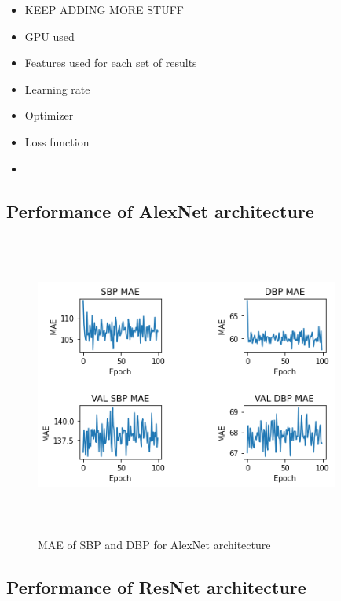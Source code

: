 \begin{itemize}
    \item KEEP ADDING MORE STUFF
    \item GPU used
    \item Features used for each set of results
    \item Learning rate
    \item Optimizer
    \item Loss function
    \item 
\end{itemize}

\subsection{Performance of AlexNet architecture}

\begin{figure}[H]
    \centering
    \includegraphics[width=10cm,height=10cm,keepaspectratio]{Results/alexnet.png}
    \caption{MAE of SBP and DBP for AlexNet architecture}
    \label{alexnetResults}
\end{figure}

\subsection{Performance of ResNet architecture}

